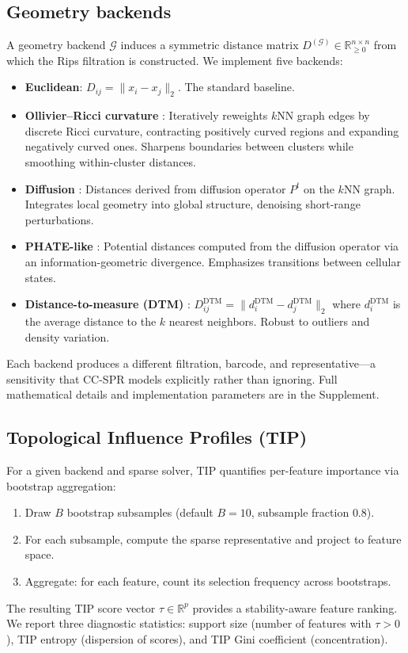 \documentclass[11pt]{article}
\begin{document}
\subsection{Geometry backends}
\label{sec:backends}

A geometry backend $\mathcal{G}$ induces a symmetric distance matrix $D^{(\mathcal{G})} \in \mathbb{R}_{\ge 0}^{n \times n}$ from which the Rips filtration is constructed.
We implement five backends:

\begin{itemize}[leftmargin=1.5em]
\item \textbf{Euclidean}: $D_{ij} = \|x_i - x_j\|_2$. The standard baseline.
\item \textbf{Ollivier--Ricci curvature} \cite{ollivier2009, ni2019community}: Iteratively reweights $k$NN graph edges by discrete Ricci curvature, contracting positively curved regions and expanding negatively curved ones. Sharpens boundaries between clusters while smoothing within-cluster distances.
\item \textbf{Diffusion} \cite{coifman2006diffusion}: Distances derived from diffusion operator $P^t$ on the $k$NN graph. Integrates local geometry into global structure, denoising short-range perturbations.
\item \textbf{PHATE-like} \cite{moon2019phate}: Potential distances computed from the diffusion operator via an information-geometric divergence. Emphasizes transitions between cellular states.
\item \textbf{Distance-to-measure (DTM)} \cite{chazal2011dtm}: $D_{ij}^{\text{DTM}} = \|d_i^{\text{DTM}} - d_j^{\text{DTM}}\|_2$ where $d_i^{\text{DTM}}$ is the average distance to the $k$ nearest neighbors. Robust to outliers and density variation.
\end{itemize}

Each backend produces a different filtration, barcode, and representative---a sensitivity that CC-SPR models explicitly rather than ignoring.
Full mathematical details and implementation parameters are in the Supplement.

\subsection{Topological Influence Profiles (TIP)}
\label{sec:tip}

For a given backend and sparse solver, TIP quantifies per-feature importance via bootstrap aggregation:
\begin{enumerate}[leftmargin=1.5em]
\item Draw $B$ bootstrap subsamples (default $B=10$, subsample fraction $0.8$).
\item For each subsample, compute the sparse representative and project to feature space.
\item Aggregate: for each feature, count its selection frequency across bootstraps.
\end{enumerate}
The resulting TIP score vector $\tau \in \mathbb{R}^p$ provides a stability-aware feature ranking.
We report three diagnostic statistics: support size (number of features with $\tau > 0$), TIP entropy (dispersion of scores), and TIP Gini coefficient (concentration).
\end{document}
